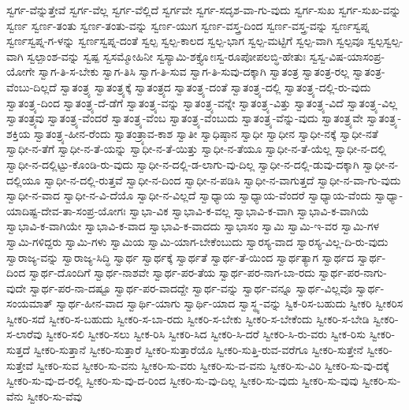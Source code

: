 {ಸ್ವರ್ಗ-ವೆನ್ನುತ್ತೇವೆ
ಸ್ವರ್ಗ-ವೆಲ್ಲ
ಸ್ವರ್ಗ-ವೆಲ್ಲಿದೆ
ಸ್ವರ್ಗವೇ
ಸ್ವರ್ಗ-ಸದೃಶ-ವಾ-ಗು-ವುದು
ಸ್ವರ್ಗ-ಸುಖ
ಸ್ವರ್ಗ-ಸುಖ-ವನ್ನು
ಸ್ವರ್ಣ
ಸ್ವರ್ಣ-ತಂತು
ಸ್ವರ್ಣ-ತಂತು-ವನ್ನು
ಸ್ವರ್ಣ-ಯುಗ
ಸ್ವರ್ಣ-ವಸ್ತ್ರ-ದಿಂದ
ಸ್ವರ್ಣ-ವಸ್ತ್ರ-ವನ್ನು
ಸ್ವರ್ಣಸ್ವಪ್ನ
ಸ್ವರ್ಣಸ್ವಪ್ನ-ಗ-ಳನ್ನು
ಸ್ವರ್ಣಸ್ವಪ್ನ-ದಂತೆ
ಸ್ವಲ್ಪ
ಸ್ವಲ್ಪ-ಕಾಲದ
ಸ್ವಲ್ಪ-ಭಾಗ
ಸ್ವಲ್ಪ-ಮಟ್ಟಿಗೆ
ಸ್ವಲ್ಪ-ವಾಗಿ
ಸ್ವಲ್ಪವೂ
ಸ್ವಲ್ಪಸ್ವಲ್ಪ-ವಾಗಿ
ಸ್ವಲ್ಪಾಂಶ-ವನ್ನು
ಸ್ವಷ್ಪ
ಸ್ವಸಮ್ಮೋಹಿನೀ
ಸ್ವಸ್ಯಾಮಿ-ಶಕ್ತ್ಯೋಃಸ್ವ-ರೂಪೋಪಲಬ್ಧಿ-ಹೇತುಃ
ಸ್ವಸ್ವ-ವಿಷ-ಯಾಸಂಪ್ರ-ಯೋಗೇ
ಸ್ವಾಗ-ತಿ-ಸ-ಬೇಕು
ಸ್ವಾಗ-ತಿಸಿ
ಸ್ವಾಗ-ತಿ-ಸುವ
ಸ್ವಾಗ-ತಿ-ಸುವು-ದಕ್ಕಾಗಿ
ಸ್ವಾತಂತ್ರ
ಸ್ವಾತಂತ್ರ-ರಲ್ಲ
ಸ್ವಾತಂತ್ರ-ವೆಂಬು-ದಿಲ್ಲದೆ
ಸ್ವಾತಂತ್ರ್ಯ
ಸ್ವಾತಂತ್ರ್ಯಕ್ಕೆ
ಸ್ವಾತಂತ್ರ್ಯದ
ಸ್ವಾತಂತ್ರ್ಯ-ದಂತೆ
ಸ್ವಾತಂತ್ರ್ಯ-ದಲ್ಲಿ
ಸ್ವಾತಂತ್ರ್ಯ-ದಲ್ಲಿ-ರು-ವುದು
ಸ್ವಾತಂತ್ರ್ಯ-ದಿಂದ
ಸ್ವಾತಂತ್ರ್ಯ-ದೆ-ಡೆಗೆ
ಸ್ವಾತಂತ್ರ್ಯ-ವನ್ನು
ಸ್ವಾತಂತ್ರ್ಯ-ವನ್ನೇ
ಸ್ವಾತಂತ್ರ್ಯ-ವಿತ್ತು
ಸ್ವಾತಂತ್ರ್ಯ-ವಿದೆ
ಸ್ವಾತಂತ್ರ್ಯ-ವಿಲ್ಲ
ಸ್ವಾತಂತ್ರ್ಯವು
ಸ್ವಾತಂತ್ರ್ಯ-ವೆಂದರೆ
ಸ್ವಾತಂತ್ರ್ಯ-ವೆಂಬ
ಸ್ವಾತಂತ್ರ್ಯ-ವೆಂಬುದು
ಸ್ವಾತಂತ್ರ್ಯ-ವೆನ್ನು-ವುದು
ಸ್ವಾತಂತ್ರ್ಯವೇ
ಸ್ವಾತಂತ್ರ್ಯ-ಶಕ್ತಿಯ
ಸ್ವಾತಂತ್ರ್ಯ-ಹೀನ-ರೆಂದು
ಸ್ವಾತಂತ್ರ್ಯಾವ-ಕಾಶ
ಸ್ವಾತೀ
ಸ್ವಾಧಿಷ್ಠಾನ
ಸ್ವಾಧೀ
ಸ್ವಾಧೀನ
ಸ್ವಾಧೀ-ನಕ್ಕೆ
ಸ್ವಾಧೀ-ನತೆ
ಸ್ವಾಧೀ-ನ-ತೆಗೆ
ಸ್ವಾಧೀ-ನ-ತೆ-ಯನ್ನು
ಸ್ವಾಧೀ-ನ-ತೆ-ಯಿತ್ತು
ಸ್ವಾಧೀ-ನ-ತೆಯೂ
ಸ್ವಾಧೀ-ನ-ತೆ-ಯೆಲ್ಲ
ಸ್ವಾಧೀ-ನ-ದಲ್ಲಿ
ಸ್ವಾಧೀ-ನ-ದಲ್ಲಿಟ್ಟು-ಕೊಂಡಿ-ರು-ವುದು
ಸ್ವಾಧೀ-ನ-ದಲ್ಲಿ-ಡ-ಲಾಗು-ವು-ದಿಲ್ಲ
ಸ್ವಾಧೀ-ನ-ದಲ್ಲಿ-ಡುವು-ದಕ್ಕಾಗಿ
ಸ್ವಾಧೀ-ನ-ದಲ್ಲಿಯೂ
ಸ್ವಾಧೀ-ನ-ದಲ್ಲಿ-ರುತ್ತವೆ
ಸ್ವಾಧೀ-ನ-ದಿಂದ
ಸ್ವಾಧೀ-ನ-ಪಡಿಸಿ
ಸ್ವಾಧೀ-ನ-ವಾಗುತ್ತದೆ
ಸ್ವಾಧೀ-ನ-ವಾ-ಗು-ವುದು
ಸ್ವಾಧೀ-ನ-ವಾದ
ಸ್ವಾಧೀ-ನ-ವಿ-ದೆಯೊ
ಸ್ವಾಧೀ-ನ-ವಿಲ್ಲದೆ
ಸ್ವಾಧ್ಯಾಯ
ಸ್ವಾಧ್ಯಾಯ-ವೆಂದರೆ
ಸ್ವಾಧ್ಯಾಯ-ವೆಂದು
ಸ್ವಾಧ್ಯಾ-ಯಾದಿಷ್ಟ-ದೇವ-ತಾ-ಸಂಪ್ರ-ಯೋಗಃ
ಸ್ವಾಭಾ-ವಿಕ
ಸ್ವಾಭಾವಿ-ಕ-ವಲ್ಲ
ಸ್ವಾಭಾವಿ-ಕ-ವಾಗಿ
ಸ್ವಾಭಾವಿ-ಕ-ವಾಗಿಯೆ
ಸ್ವಾಭಾವಿ-ಕ-ವಾಗಿಯೇ
ಸ್ವಾಭಾವಿ-ಕ-ವಾದ
ಸ್ವಾಭಾವಿ-ಕ-ವಾದದು
ಸ್ವಾಭಾಸಂ
ಸ್ವಾಮಿ
ಸ್ವಾಮಿ-ಇ-ವರ
ಸ್ವಾಮಿ-ಗಳ
ಸ್ವಾಮಿ-ಗಳಿದ್ದರು
ಸ್ವಾಮಿ-ಗಳು
ಸ್ವಾಮಿಯ
ಸ್ವಾಮಿ-ಯಾಗ-ಬೇಕೆಂಬುದು
ಸ್ವಾರಸ್ಯ-ವಾದ
ಸ್ವಾರಸ್ಯ-ವಿಲ್ಲ-ದಿ-ರು-ವುದು
ಸ್ವಾರಾಜ್ಯ-ವನ್ನು
ಸ್ವಾರಾಜ್ಯ-ಸಿದ್ಧಿ
ಸ್ವಾರ್ಥ
ಸ್ವಾರ್ಥಕ್ಕೆ
ಸ್ವಾರ್ಥತೆ
ಸ್ವಾರ್ಥ-ತೆ-ಯಿಂದ
ಸ್ವಾರ್ಥತ್ಯಾಗ
ಸ್ವಾರ್ಥದ
ಸ್ವಾರ್ಥ-ದಿಂದ
ಸ್ವಾರ್ಥ-ದೊಂದಿಗೆ
ಸ್ವಾರ್ಥ-ನಾಶವೇ
ಸ್ವಾರ್ಥ-ಪರ-ತೆಯ
ಸ್ವಾರ್ಥ-ಪರ-ನಾಗ-ಬಾ-ರದು
ಸ್ವಾರ್ಥ-ಪರ-ನಾಗು-ವುದೇ
ಸ್ವಾರ್ಥ-ಪರ-ನಾ-ದಷ್ಟೂ
ಸ್ವಾರ್ಥ-ಪರ-ವಾದದ್ದೇ
ಸ್ವಾರ್ಥ-ವನ್ನು
ಸ್ವಾರ್ಥ-ವನ್ನೂ
ಸ್ವಾರ್ಥ-ವಿಲ್ಲವೊ
ಸ್ವಾರ್ಥ-ಸಂಯಮಾತ್
ಸ್ವಾರ್ಥ-ಹೀನ-ವಾದ
ಸ್ವಾರ್ಥಿ-ಯಾಗು
ಸ್ವಾರ್ಥಿ-ಯಾದ
ಸ್ವಾಸ್ಥ್ಯ-ವನ್ನು
ಸ್ವಿಕ-ರಿಸ-ಬಹುದು
ಸ್ವೀಕರಿ
ಸ್ವೀಕರಿಸ
ಸ್ವೀಕರಿ-ಸದೆ
ಸ್ವೀಕರಿ-ಸ-ಬಹುದು
ಸ್ವೀಕರಿ-ಸ-ಬಾ-ರದು
ಸ್ವೀಕರಿ-ಸ-ಬೇಕು
ಸ್ವೀಕರಿ-ಸ-ಬೇಕೆಂದು
ಸ್ವೀಕರಿ-ಸ-ಬೇಡಿ
ಸ್ವೀಕರಿ-ಸ-ಲಾರೆವು
ಸ್ವೀಕರಿ-ಸಲಿ
ಸ್ವೀಕರಿ-ಸಲು
ಸ್ವೀಕ-ರಿಸಿ
ಸ್ವೀಕರಿ-ಸಿದ
ಸ್ವೀಕರಿ-ಸಿ-ದರೆ
ಸ್ವೀಕರಿ-ಸಿ-ರು-ವರು
ಸ್ವೀಕ-ರಿಸು
ಸ್ವೀಕರಿ-ಸುತ್ತದೆ
ಸ್ವೀಕರಿ-ಸುತ್ತಾನೆ
ಸ್ವೀಕರಿ-ಸುತ್ತಾರೆ
ಸ್ವೀಕರಿ-ಸುತ್ತಾರೆಯೊ
ಸ್ವೀಕರಿ-ಸುತ್ತಿ-ರುವ-ವರೆಗೂ
ಸ್ವೀಕರಿ-ಸುತ್ತೇನೆ
ಸ್ವೀಕರಿ-ಸುತ್ತೇವೆ
ಸ್ವೀಕರಿ-ಸುವ
ಸ್ವೀಕರಿ-ಸು-ವನು
ಸ್ವೀಕರಿ-ಸು-ವರು
ಸ್ವೀಕರಿ-ಸು-ವ-ವನು
ಸ್ವೀಕರಿ-ಸು-ವಿರಿ
ಸ್ವೀಕರಿ-ಸು-ವು-ದಕ್ಕೆ
ಸ್ವೀಕರಿ-ಸು-ವು-ದ-ರಲ್ಲಿ
ಸ್ವೀಕರಿ-ಸು-ವು-ದ-ರಿಂದ
ಸ್ವೀಕರಿ-ಸು-ವು-ದಿಲ್ಲ
ಸ್ವೀಕರಿ-ಸು-ವುದು
ಸ್ವೀಕರಿ-ಸು-ವುವು
ಸ್ವೀಕರಿ-ಸು-ವೆನು
ಸ್ವೀಕರಿ-ಸು-ವೆವು
}

